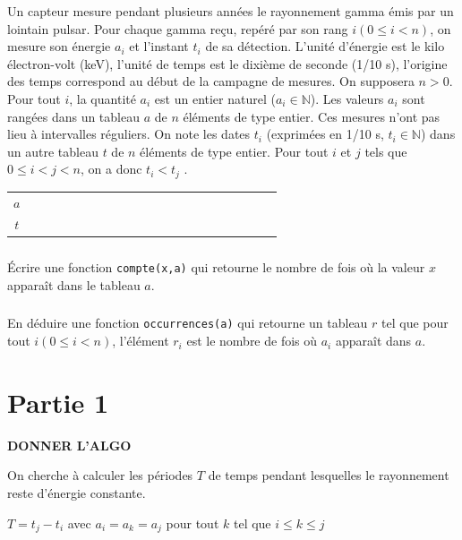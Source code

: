 \documentclass[10pt,fleqn]{article} %
\begin{document}

\vspace{2cm}
\pagestyle{fancy}
\thispagestyle{plain}


Un capteur mesure pendant plusieurs années le rayonnement gamma émis par un lointain pulsar.
Pour chaque gamma reçu, repéré par son rang $i (0 \le i < n)$, on mesure son énergie $a_i$ et l’instant $t_i$ de sa détection.
L’unité d’énergie est le kilo électron-volt (keV), l’unité de temps est le dixième de seconde (1/10 s), l’origine des temps correspond au début de la campagne de mesures.
On supposera $n > 0$.
Pour tout $i$, la quantité $a_i$ est un entier naturel ($a_i \in \mathbb{N}$).
Les valeurs $a_i$ sont rangées dans un tableau $a$ de $n$ éléments de type entier. Ces mesures n’ont pas lieu à intervalles réguliers.
On note les dates $t_i$ (exprimées en 1/10 s, $t_i \in \mathbb{N}$) dans un autre tableau $t$ de $n$ éléments de type entier.
Pour tout $i$ et $j$ tels que $0 \le i < j < n$, on a donc $t_i < t_j$ .

\begin{center}

\begin{tabular}{c|c|c|c|c|c|c|c|c|c|c|c|c|c|c|c|c|c|c|c|c|}
\cline{2-21}
$a$&&&&&&&&&&&&&&&&&&&&\\
\cline{2-21}
\cline{2-21}
$t$&&&&&&&&&&&&&&&&&&&&\\
\cline{2-21}
\end{tabular}
\end{center}


\setcounter{exo}{0}
\subparagraph{} Écrire une fonction \texttt{compte(x,a)} qui retourne le nombre de fois où la valeur $x$ apparaît dans le tableau $a$.



\subparagraph{} En déduire une fonction \texttt{occurrences(a)} qui retourne un tableau $r$ tel que pour tout $i (0 \le i < n)$, l’élément $r_i$ est le nombre de fois où $a_i$ apparaît dans $a$.



\section{Partie 1}


\textbf{DONNER L'ALGO}


On cherche à calculer les périodes $T$ de temps pendant lesquelles le rayonnement reste d’énergie constante.

$T = t_j - t_i$ avec $a_i = a_k = a_j$ pour tout $k$ tel que $i \le k \le j$
\end{document}
